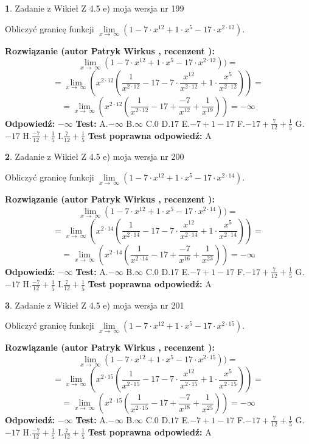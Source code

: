 \documentclass[12pt, a4paper]{article}
\theoremstyle{definition} %
\newtheorem{zad}{}
\newcommand{\zadStart}[1]{\begin{zad}#1\newline}
\newcommand{\zadStop}{\end{zad}}
\newcommand{\rozwStart}[2]{\noindent \textbf{Rozwiązanie (autor #1 , recenzent #2): }\newline}
\newcommand{\rozwStop}{\newline}
\newcommand{\odpStart}{\noindent \textbf{Odpowiedź:}\newline}
\newcommand{\odpStop}{\newline}
\newcommand{\testStart}{\noindent \textbf{Test:}\newline}
\newcommand{\testStop}{\newline}
\newcommand{\kluczStart}{\noindent \textbf{Test poprawna odpowiedź:}\newline}
\newcommand{\kluczStop}{\newline}
\begin{document}
\zadStart{Zadanie z Wikieł Z 4.5 e) moja wersja nr 199}



Obliczyć granicę funkcji  $\lim\limits_{x\to\ \infty}(1 - 7 \cdot x^{12}+1 \cdot x^{5}- 17 \cdot x^{2\cdot12})$.
\zadStop
\rozwStart{Patryk Wirkus}{}
$$\lim\limits_{x\to\ \infty}(1 - 7 \cdot x^{12}+1 \cdot x^{5}- 17 \cdot x^{2\cdot12}))=$$
$$=\lim\limits_{x\to\ \infty}(x^{2\cdot12}(\frac{1}{x^{2\cdot12}}-17 -7 \cdot \frac{x^{12}}{x^{2\cdot12}}+1 \cdot \frac{x^{5}}{x^{2\cdot12}}))=$$
$$=\lim\limits_{x\to\ \infty}(x^{2\cdot12}(\frac{1}{x^{2\cdot12}}-17 + \frac{-7}{x^{12}}+ \frac{1}{x^{19}}))=-\infty$$
\rozwStop
\odpStart
$-\infty$
\odpStop
\testStart
A.$-\infty$ B.$\infty$ C.$0$ D.$17$ E.$-7 + 1 - 17$
F.$-17+\frac{7}{12}+\frac{1}{5}$ G.$-17$
H.$\frac{-7}{12}+\frac{1}{5}$
I.$\frac{7}{12}+\frac{1}{5}$
\testStop
\kluczStart
A
\kluczStop



\zadStart{Zadanie z Wikieł Z 4.5 e) moja wersja nr 200}



Obliczyć granicę funkcji  $\lim\limits_{x\to\ \infty}(1 - 7 \cdot x^{12}+1 \cdot x^{5}- 17 \cdot x^{2\cdot14})$.
\zadStop
\rozwStart{Patryk Wirkus}{}
$$\lim\limits_{x\to\ \infty}(1 - 7 \cdot x^{12}+1 \cdot x^{5}- 17 \cdot x^{2\cdot14}))=$$
$$=\lim\limits_{x\to\ \infty}(x^{2\cdot14}(\frac{1}{x^{2\cdot14}}-17 -7 \cdot \frac{x^{12}}{x^{2\cdot14}}+1 \cdot \frac{x^{5}}{x^{2\cdot14}}))=$$
$$=\lim\limits_{x\to\ \infty}(x^{2\cdot14}(\frac{1}{x^{2\cdot14}}-17 + \frac{-7}{x^{16}}+ \frac{1}{x^{23}}))=-\infty$$
\rozwStop
\odpStart
$-\infty$
\odpStop
\testStart
A.$-\infty$ B.$\infty$ C.$0$ D.$17$ E.$-7 + 1 - 17$
F.$-17+\frac{7}{12}+\frac{1}{5}$ G.$-17$
H.$\frac{-7}{12}+\frac{1}{5}$
I.$\frac{7}{12}+\frac{1}{5}$
\testStop
\kluczStart
A
\kluczStop



\zadStart{Zadanie z Wikieł Z 4.5 e) moja wersja nr 201}



Obliczyć granicę funkcji  $\lim\limits_{x\to\ \infty}(1 - 7 \cdot x^{12}+1 \cdot x^{5}- 17 \cdot x^{2\cdot15})$.
\zadStop
\rozwStart{Patryk Wirkus}{}
$$\lim\limits_{x\to\ \infty}(1 - 7 \cdot x^{12}+1 \cdot x^{5}- 17 \cdot x^{2\cdot15}))=$$
$$=\lim\limits_{x\to\ \infty}(x^{2\cdot15}(\frac{1}{x^{2\cdot15}}-17 -7 \cdot \frac{x^{12}}{x^{2\cdot15}}+1 \cdot \frac{x^{5}}{x^{2\cdot15}}))=$$
$$=\lim\limits_{x\to\ \infty}(x^{2\cdot15}(\frac{1}{x^{2\cdot15}}-17 + \frac{-7}{x^{18}}+ \frac{1}{x^{25}}))=-\infty$$
\rozwStop
\odpStart
$-\infty$
\odpStop
\testStart
A.$-\infty$ B.$\infty$ C.$0$ D.$17$ E.$-7 + 1 - 17$
F.$-17+\frac{7}{12}+\frac{1}{5}$ G.$-17$
H.$\frac{-7}{12}+\frac{1}{5}$
I.$\frac{7}{12}+\frac{1}{5}$
\testStop
\kluczStart
A
\kluczStop
\end{document}
